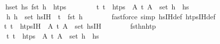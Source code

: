 \begin{isabellebody}
\ \ \ \ \ \ \isamarkupfalse%
\ {\isacartoucheopen}{\isacharparenleft}{\kern0pt}{\isasymforall}h{\isasymin}set\ hs{}{\isachardot}{\kern0pt}\ fst\ h\ {\isasymnotin}\ htps{\isacharparenright}{\kern0pt}{\isacartoucheclose}\isanewline
\ \ \ \ \ \ \ \ {\isacartoucheopen}{\isasymAnd}t{\isachardot}{\kern0pt}\ t\ {\isasymin}\ htps\ {\isasymLongrightarrow}\ {\isasymexists}A{\isachardot}{\kern0pt}\ {\isacharparenleft}{\kern0pt}t{\isacharcomma}{\kern0pt}\ A{\isacharparenright}{\kern0pt}\ {\isasymin}\ set\ {\isacharparenleft}{\kern0pt}h\ {\isacharhash}{\kern0pt}\ hs{}{\isacharparenright}{\kern0pt}{\isacartoucheclose}\isanewline
\ \ \ \ \ \ \ \ {\isacartoucheopen}{\isasymAnd}h{\isacharprime}{\kern0pt}{\isachardot}{\kern0pt}\ h{\isacharprime}{\kern0pt}\ {\isasymin}\ set\ {\isacharparenleft}{\kern0pt}hs{\isacharunderscore}{\kern0pt}IH{\isacharparenright}{\kern0pt}\ {\isasymLongrightarrow}\ t\ {\isasymnoteq}\ fst\ h{\isacharprime}{\kern0pt}{\isacartoucheclose}\isanewline
\ \ \ \ \ \ \isamarkupfalse%
\ {\isacharparenleft}{\kern0pt}fastforce\ simp{\isacharcolon}{\kern0pt}\ hs{\isacharunderscore}{\kern0pt}IH{\isacharunderscore}{\kern0pt}def\ htps{\isacharunderscore}{\kern0pt}IH{\isacharunderscore}{\kern0pt}def{\isacharparenright}{\kern0pt}\isanewline
\ \ \ \ \isamarkupfalse%
\ \isamarkupfalse%
\ {\isachardoublequoteopen}{\isasymAnd}t{\isacharprime}{\kern0pt}{\isacharprime}{\kern0pt}{\isachardot}{\kern0pt}\ t{\isacharprime}{\kern0pt}{\isacharprime}{\kern0pt}\ {\isasymin}\ htps{\isacharunderscore}{\kern0pt}IH\ {\isasymLongrightarrow}\ {\isasymexists}A{\isachardot}{\kern0pt}\ {\isacharparenleft}{\kern0pt}t{\isacharprime}{\kern0pt}{\isacharprime}{\kern0pt}{\isacharcomma}{\kern0pt}\ A{\isacharparenright}{\kern0pt}\ {\isasymin}\ set\ {\isacharparenleft}{\kern0pt}hs{\isacharprime}{\kern0pt}{\isacharunderscore}{\kern0pt}IH{\isacharparenright}{\kern0pt}{\isachardoublequoteclose}\isanewline
\ \ \ \ \ \ \isamarkupfalse%
\ fst{\isacharunderscore}{\kern0pt}h{}{\isacharprime}{\kern0pt}{\isacharunderscore}{\kern0pt}n{\isacharunderscore}{\kern0pt}htp\isanewline
\ \ \ \ \ \ \ \ {\isacartoucheopen}{\isasymAnd}t{\isachardot}{\kern0pt}\ t\ {\isasymin}\ htps\ {\isasymLongrightarrow}\ {\isasymexists}A{\isachardot}{\kern0pt}\ {\isacharparenleft}{\kern0pt}t{\isacharcomma}{\kern0pt}\ A{\isacharparenright}{\kern0pt}\ {\isasymin}\ set\ {\isacharparenleft}{\kern0pt}h{\isacharprime}{\kern0pt}\ {\isacharhash}{\kern0pt}\ hs{}{\isacharprime}{\kern0pt}{\isacharparenright}{\kern0pt}{\isacartoucheclose}\isanewline

\end{isabellebody}

